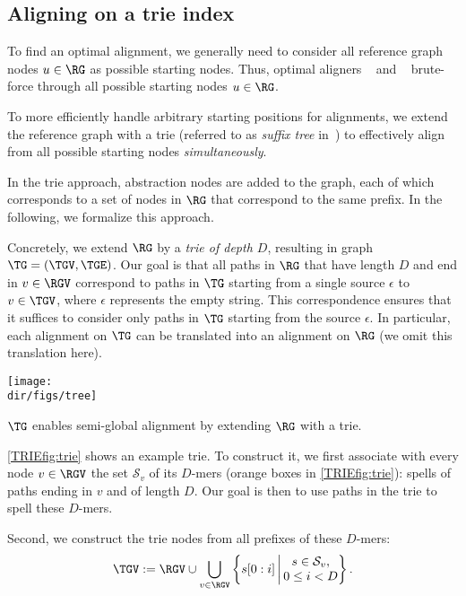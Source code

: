 \subsection{Aligning on a trie index} \label{TRIEsubsec:trie}

To find an optimal alignment, we generally need to consider all reference graph
nodes $u \in \RG$ as possible starting nodes. Thus, optimal aligners
\pasgal~\cite{jain_accelerating_2019} and
\bitparallel~\cite{rautiainen_bitparallel_2019} brute-force through all
possible starting nodes $u \in \RG$.

To more efficiently handle arbitrary starting positions for alignments, we
extend the reference graph with a trie (referred to as \emph{suffix tree}
in~\cite{dox2018efficient}) to effectively align from all possible starting
nodes \emph{simultaneously}.

In the trie approach, abstraction nodes are added to the graph, each of which
corresponds to a set of nodes in $\RG$ that correspond to the same prefix. In
the following, we formalize this approach.

Concretely, we extend $\RG$ by a \emph{trie of depth $D$}, resulting in graph
$\TG=(\TGV,\TGE)$. Our goal is that all paths in $\RG$ that have length $D$ and
end in $v \in \RGV$ correspond to paths in $\TG$ starting from a single source
$\epsilon$ to $v \in \TGV$, where $\epsilon$ represents the empty string. This
correspondence ensures that it suffices to consider only paths in $\TG$ starting
from the source $\epsilon$. In particular, each alignment on $\TG$ can
be translated into an alignment on $\RG$ (we omit this translation
here).

\begin{floatingfigure}[l]{0.46\textwidth}
	\texttt{[image: \\dir/figs/tree]}
	\caption[Indexing the reference with a trie]{$\TG$ enables semi-global alignment by extending $\RG$ with a trie.}
	\label{TRIEfig:trie}
\end{floatingfigure}

\cref{TRIEfig:trie} shows an example trie. To construct it, we first associate with
every node $v \in \RGV$ the set $\mathcal{S}_v$ of its $D$-mers (orange boxes in
\cref{TRIEfig:trie}): spells of paths ending in $v$ and of length $D$. Our goal is
then to use paths in the trie to spell these $D$-mers.

Second, we construct the trie nodes from all prefixes of these $D$-mers:
%
$$ \TGV:= \RGV \cup
\bigcup_{v \in \RGV} \left\{s[0:i] \,\middle|\, \begin{array}{{@{}c@{}}}
	s \in \mathcal{S}_v, \\
	0 \leq i < D
\end{array} \right\}.
$$

